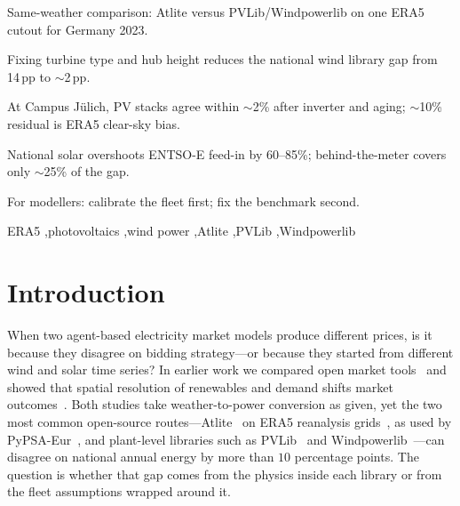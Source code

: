 \documentclass[preprint,12pt,number]{elsarticle}
\begin{document}
\begin{frontmatter}
\begin{highlights}
\item Same-weather comparison: Atlite versus PVLib/Windpowerlib on one ERA5 cutout for Germany 2023.
\item Fixing turbine type and hub height reduces the national wind library gap from 14\,pp to $\sim$2\,pp.
\item At Campus Jülich, PV stacks agree within $\sim$2\% after inverter and aging; $\sim$10\% residual is ERA5 clear-sky bias.
\item National solar overshoots ENTSO-E feed-in by 60--85\%; behind-the-meter covers only $\sim$25\% of the gap.
\item For modellers: calibrate the fleet first; fix the benchmark second.
\end{highlights}

\begin{keyword}
ERA5 \sep photovoltaics \sep wind power \sep Atlite \sep PVLib \sep Windpowerlib
\end{keyword}

\end{frontmatter}

\section{Introduction}

When two agent-based electricity market models produce different prices, is it because they disagree on bidding strategy---or because they started from different wind and solar time series?
In earlier work we compared open market tools~\citep{Maurer2024KnowTools} and showed that spatial resolution of renewables and demand shifts market outcomes~\citep{Maurer2025Resolution}.
Both studies take weather-to-power conversion as given, yet the two most common open-source routes---Atlite~\citep{Hofmann2021} on ERA5 reanalysis grids~\citep{Hersbach2020,ERA5CDS}, as used by PyPSA-Eur~\citep{PyPSAEur}, and plant-level libraries such as PVLib~\citep{pvlib2023,pvlib2023iotools} and Windpowerlib~\citep{windpowerlib}---can disagree on national annual energy by more than $10$ percentage points.
The question is whether that gap comes from the physics inside each library or from the fleet assumptions wrapped around it.
\end{document}
